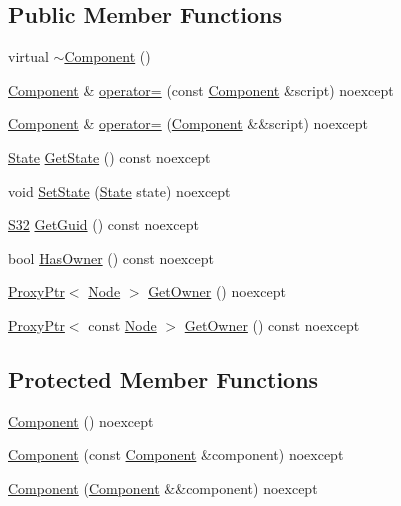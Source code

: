 \subsection*{Public Member Functions}
\begin{DoxyCompactItemize}
\item 
virtual \hyperlink{classmage_1_1_component_a2326c6df733b0cabf3086ad4187ba607}{$\sim$\+Component} ()
\item 
\hyperlink{classmage_1_1_component}{Component} \& \hyperlink{classmage_1_1_component_a69c2e920fb88323fa0fc5174671f4a01}{operator=} (const \hyperlink{classmage_1_1_component}{Component} \&script) noexcept
\item 
\hyperlink{classmage_1_1_component}{Component} \& \hyperlink{classmage_1_1_component_a0a03d80d37a6fa38616b955890471e06}{operator=} (\hyperlink{classmage_1_1_component}{Component} \&\&script) noexcept
\item 
\hyperlink{namespacemage_a8159a53ed2ac3a0fe7058b2a051fa969}{State} \hyperlink{classmage_1_1_component_a56f63648ba479decbba4a6fbaa544b4d}{Get\+State} () const noexcept
\item 
void \hyperlink{classmage_1_1_component_a95a74e2df3f326c4e92ac6dea7ed97be}{Set\+State} (\hyperlink{namespacemage_a8159a53ed2ac3a0fe7058b2a051fa969}{State} state) noexcept
\item 
\hyperlink{namespacemage_a642e05c5c83642b6946703615cdbf2da}{S32} \hyperlink{classmage_1_1_component_af5fedd0cb22d3fe5b26eec859eeff79f}{Get\+Guid} () const noexcept
\item 
bool \hyperlink{classmage_1_1_component_a8e62e223bdacc3eebddc43f8ebc8c4d9}{Has\+Owner} () const noexcept
\item 
\hyperlink{classmage_1_1_proxy_ptr}{Proxy\+Ptr}$<$ \hyperlink{classmage_1_1_node}{Node} $>$ \hyperlink{classmage_1_1_component_af6261b2a7688dd5a078a917e1ec69e0b}{Get\+Owner} () noexcept
\item 
\hyperlink{classmage_1_1_proxy_ptr}{Proxy\+Ptr}$<$ const \hyperlink{classmage_1_1_node}{Node} $>$ \hyperlink{classmage_1_1_component_a97f402d0f75eff5a893abd2821a5335d}{Get\+Owner} () const noexcept
\end{DoxyCompactItemize}
\subsection*{Protected Member Functions}
\begin{DoxyCompactItemize}
\item 
\hyperlink{classmage_1_1_component_aef66a6573c094143bf95d3a81df1098e}{Component} () noexcept
\item 
\hyperlink{classmage_1_1_component_abcd9e6ba7f9691f51d1802d5cf8a365a}{Component} (const \hyperlink{classmage_1_1_component}{Component} \&component) noexcept
\item 
\hyperlink{classmage_1_1_component_a3abb21d27d4e89513787396c27b0ff6d}{Component} (\hyperlink{classmage_1_1_component}{Component} \&\&component) noexcept
\end{DoxyCompactItemize}
